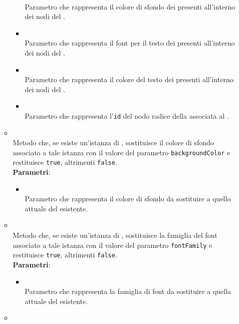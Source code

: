 \begin{itemize}
\begin{itemize}
\begin{itemize}
\\ Parametro che rappresenta il colore di sfondo dei  presenti all'interno dei nodi del .
\item {}
\\ Parametro che rappresenta il font per il testo dei  presenti all'interno dei nodi del .
\item {}
\\ Parametro che rappresenta il colore del testo dei  presenti all'interno dei nodi del .
\item {}
\\ Parametro che rappresenta l'\texttt{id} del nodo radice della  associata al .
\end{itemize}
\item {}
\\ Metodo che, se esiste un'istanza di , sostituisce il colore di sfondo associato a tale istanza con il valore del parametro \texttt{backgroundColor} e restituisce \texttt{true}, altrimenti \texttt{false}.
\\ \textbf{Parametri}:
\begin{itemize}
\item {}
\\ Parametro che rappresenta il colore di sfondo da sostituire a quello attuale del  esistente.
\end{itemize}
\item {}
\\ Metodo che, se esiste un'istanza di , sostituisce la famiglia del font associato a tale istanza con il valore del parametro \texttt{fontFamily} e restituisce \texttt{true}, altrimenti \texttt{false}.
\\ \textbf{Parametri}:
\begin{itemize}
\item {}
\\ Parametro che rappresenta la famiglia di font da sostituire a quella attuale del  esistente.
\end{itemize}
\item {}

\end{itemize}
\end{itemize}

